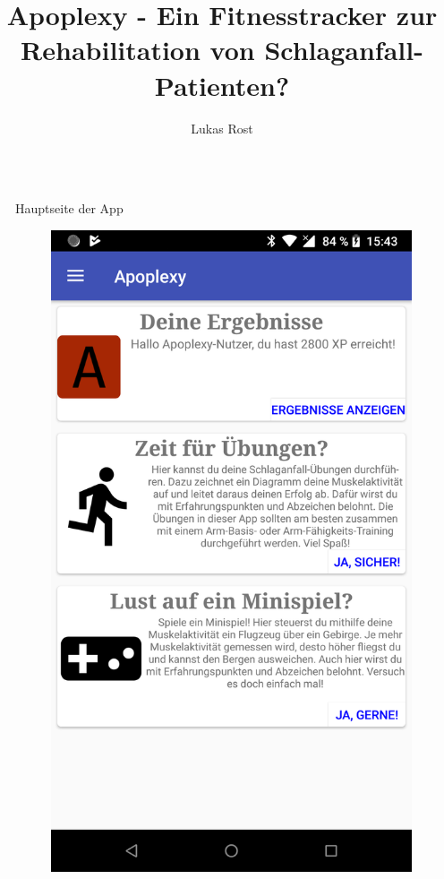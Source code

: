 \documentclass[final,20pt]{beamer}
\title{Apoplexy - Ein Fitnesstracker zur Rehabilitation von Schlaganfall-Patienten?}
\author{Lukas Rost}
\institute{Albert-Schweitzer-Gymnasium Erfurt}
\newlength{\sepwidth}
\newlength{\colwidth}
\newcommand{\separatorcolumn}{\begin{column}{\sepwidth}\end{column}}
\begin{document}
\begin{frame}[t]

\vspace{3cm}

\begin{columns}[t]
\separatorcolumn

\begin{column}{\colwidth}
   \begin{alertblock}{Hauptseite der App}
   	\begin{figure}[H]
   		\centering
   		\includegraphics[width=0.6\colwidth]{pics/device-home}
   	\end{figure}
  \end{alertblock}


\end{column}
\end{columns}
\end{frame}
\end{document}
